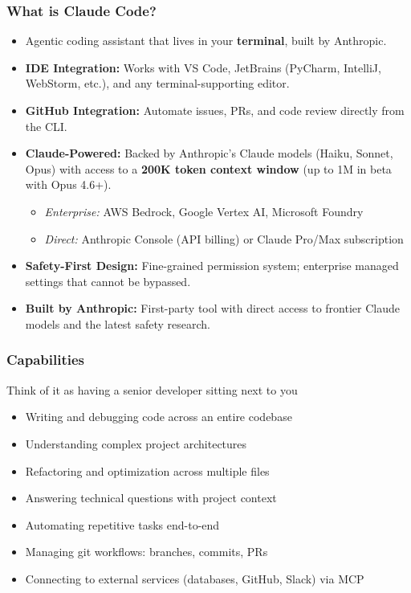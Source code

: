 \begin{frame}[fragile]\frametitle{What is Claude Code?}
  \begin{itemize}
    \item Agentic coding assistant that lives in your \textbf{terminal}, built by Anthropic.
    \item \textbf{IDE Integration:} Works with VS Code, JetBrains (PyCharm, IntelliJ, WebStorm, etc.), and any terminal-supporting editor.
    \item \textbf{GitHub Integration:} Automate issues, PRs, and code review directly from the CLI.
    \item \textbf{Claude-Powered:} Backed by Anthropic's Claude models (Haiku, Sonnet, Opus) with access to a \textbf{200K token context window} (up to 1M in beta with Opus 4.6+).
      \begin{itemize}
        \item \textit{Enterprise:} AWS Bedrock, Google Vertex AI, Microsoft Foundry
        \item \textit{Direct:} Anthropic Console (API billing) or Claude Pro/Max subscription
      \end{itemize}
    \item \textbf{Safety-First Design:} Fine-grained permission system; enterprise managed settings that cannot be bypassed.
    \item \textbf{Built by Anthropic:} First-party tool with direct access to frontier Claude models and the latest safety research.
  \end{itemize}
\end{frame}

\begin{frame}[fragile]\frametitle{Capabilities}
Think of it as having a senior developer sitting next to you
  \begin{itemize}
    \item Writing and debugging code across an entire codebase
    \item Understanding complex project architectures
    \item Refactoring and optimization across multiple files
    \item Answering technical questions with project context
    \item Automating repetitive tasks end-to-end
    \item Managing git workflows: branches, commits, PRs
    \item Connecting to external services (databases, GitHub, Slack) via MCP
  \end{itemize}
\end{frame}


